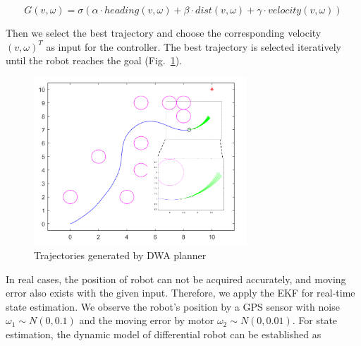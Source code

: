 \documentclass[conference]{IEEEtran}
\begin{document}
	\begin{equation}
	G(v,\omega)=\sigma (\alpha \cdot heading(v,\omega)+ \beta \cdot dist(v,\omega)+ \gamma \cdot velocity(v,\omega))
	\label{eq29}
	\end{equation}
	
	Then we select the best trajectory and choose the corresponding velocity $(v,\omega)^{T}$ as input for the controller. The best trajectory is selected iteratively until the robot reaches the goal (Fig.~\ref{fig6}).
	
	\begin{figure}[H]
		\centering
		\includegraphics[width=8cm]{fig11.png}
		\caption{Trajectories generated by DWA planner}
		\label{fig6}
	\end{figure}
	
	In real cases, the position of robot can not be acquired accurately, and moving error also exists with the given input. Therefore, we apply the EKF for real-time state estimation. We observe the robot's position by a GPS sensor with noise $\omega_{1} \sim N(0,0.1)$ and the moving error by motor $\omega_{2}\sim N(0,0.01)$. For state estimation, the dynamic model of differential robot can be established as
	
\end{document}
